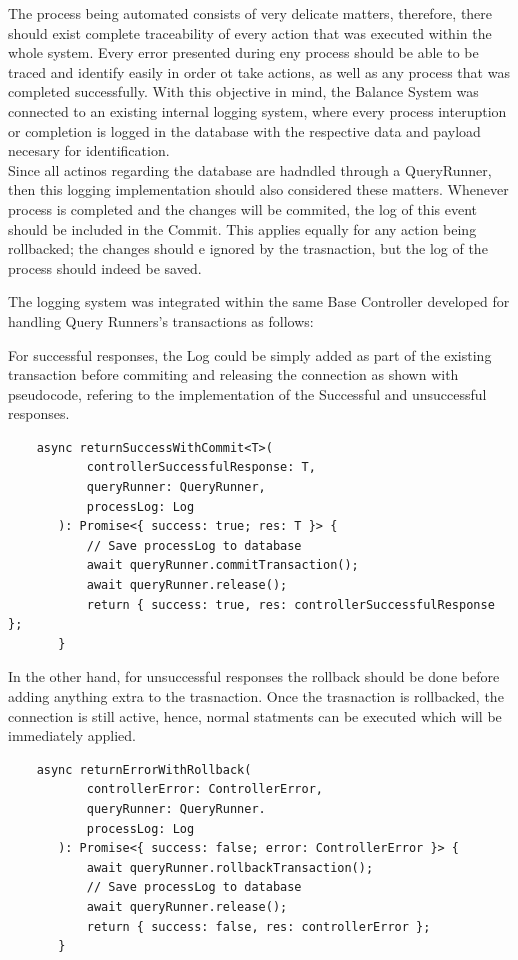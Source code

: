 The process being automated consists of very delicate matters, therefore, there should exist complete traceability of every action that was executed within the whole system. Every error presented during eny process should be able to be traced and identify easily in order ot take actions, as well as any process that was completed successfully. With this objective in mind, the Balance System was connected to an existing internal logging system, where every process interuption or completion is logged in the database with the respective data and payload necesary for identification.\\

Since all actinos regarding the database are hadndled through a QueryRunner, then this logging implementation should also considered these matters. Whenever process is completed and the changes will be commited, the log of this event should be included in the Commit. This applies equally for any action being rollbacked; the changes should e ignored by the trasnaction, but the log of the process should indeed be saved.

The logging system was integrated within the same Base Controller developed for handling Query Runners's transactions as follows:

For successful responses, the Log could be simply added as part of the existing transaction before commiting and releasing the connection as shown with pseudocode, refering to the implementation of the Successful and unsuccessful responses.

\begin{verbatim}
    async returnSuccessWithCommit<T>(
           controllerSuccessfulResponse: T,
           queryRunner: QueryRunner,
           processLog: Log
       ): Promise<{ success: true; res: T }> {
           // Save processLog to database
           await queryRunner.commitTransaction();
           await queryRunner.release();
           return { success: true, res: controllerSuccessfulResponse };
       }
\end{verbatim}

In the other hand, for unsuccessful responses the rollback should be done before adding anything extra to the trasnaction.  Once the trasnaction is rollbacked, the connection is still active, hence, normal statments can be executed which will be immediately applied.

\begin{verbatim}
    async returnErrorWithRollback(
           controllerError: ControllerError,
           queryRunner: QueryRunner.
           processLog: Log
       ): Promise<{ success: false; error: ControllerError }> {
           await queryRunner.rollbackTransaction();
           // Save processLog to database
           await queryRunner.release();
           return { success: false, res: controllerError };
       }
    \end{verbatim}

